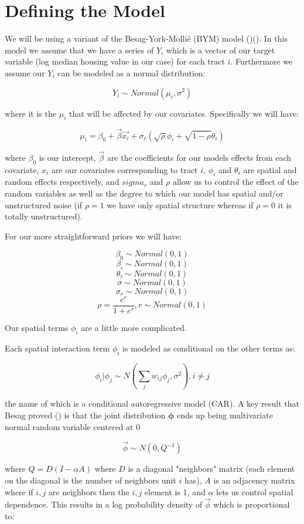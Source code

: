 \documentclass[11pt]{article}
\begin{document}
\section{Defining the Model}

We will be using a variant of the Besag-York-Mollié (BYM) model (\cite{book})(\cite{bymstan}). In this model we assume that we have a series of $Y_i$ which is a vector of our target variable (log median housing value in our case) for each tract $i$. Furthermore we assume our $Y_i$ can be modeled as a normal distribution:

$$Y_i \sim Normal(\mu_i, \sigma^2)$$

where it is the $\mu_i$ that will be affected by our covariates. Specifically we will have:

$$\mu_i= \beta_0 + \vec{\beta} \vec{x_i} + \sigma_r\left( \sqrt{\rho}\phi_i + \sqrt{1-\rho}\theta_i \right)$$

where $\beta_0$ is our intercept, $\vec{\beta}$ are the coefficients for our models effects from each covariate, $x_i$ are our covariates corresponding to tract $i$, $\phi_i$ and $\theta_i$ are spatial and random effects respectively, and $sigma_r$ and $\rho$ allow us to control the effect of the random variables as well as the degree to which our model has spatial and/or unstructured noise (if $\rho=1$ we have only spatial structure whereas if $\rho=0$ it is totally unstructured). 

For our more straightforward priors we will have:

$$\beta_0 \sim Normal(0,1)$$
$$\beta_i \sim Normal(0,1)$$
$$\theta_i \sim Normal(0,1)$$
$$\sigma \sim Normal(0,1)$$
$$\sigma_r \sim Normal(0,1)$$
$$\rho = \frac{e^{r}}{1 + e^{r}}, r\sim Normal(0,1)$$

Our spatial terms $\phi_i$ are a little more complicated. \newline

Each spatial interaction term $\phi_i$ is modeled as conditional on the other terms as:

$$\phi_i | \phi_j \sim N\left(\sum_j w_{ij}\phi_j, \sigma^2  \right), i\neq j$$

the name of which is a conditional autoregressive model (CAR). A key result that Besag proved (\cite{besag}) is that the joint distribution $\bm{\phi}$ ends up being multivariate normal random variable centered at 0

$$\vec{\phi}\sim N(0, Q^{-1})$$

where $Q=D(I-\alpha A)$ where $D$ is a diagonal "neighbors" matrix (each element on the diagonal is the number of neighbors unit $i$ has), $A$ is an adjacency matrix where if $i,j$ are neighbors then the $i,j$ element is 1, and $\alpha$ lets us control spatial dependence. This results in a log probability density of $\vec{\phi}$ which is proportional to:
\end{document}
